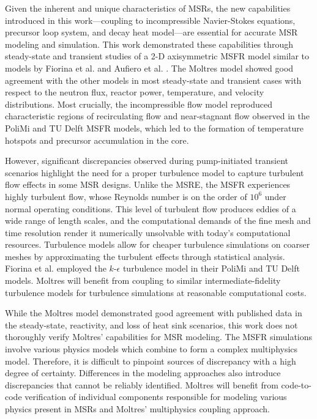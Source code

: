 Given the inherent and unique characteristics of \glspl{MSR}, the new
capabilities introduced in this work---coupling to incompressible Navier-Stokes
equations, precursor loop system, and decay heat model---are essential for
accurate \gls{MSR} modeling and simulation. This work demonstrated these
capabilities through steady-state and transient studies of a 2-D axisymmetric
\gls{MSFR} model similar to models by Fiorina et al.
\cite{fiorina_modelling_2014} and Aufiero et al.
\cite{aufiero_development_2014}. The Moltres model showed good agreement with
the other models in
most steady-state and transient cases with respect to the neutron flux, reactor
power, temperature, and velocity distributions. Most crucially, the
incompressible flow model reproduced characteristic regions of recirculating
flow and near-stagnant flow observed in the PoliMi and TU Delft \gls{MSFR}
models, which led to the formation of temperature hotspots and precursor
accumulation in the core.

However, significant discrepancies observed during pump-initiated transient
scenarios highlight the need for a proper turbulence model to capture
turbulent flow effects in some \gls{MSR} designs. Unlike the \gls{MSRE}, the
\gls{MSFR} experiences highly turbulent flow, whose Reynolds number is on the
order of $10^6$ under normal operating conditions. This level of turbulent flow
produces eddies of a wide range of length scales, and the computational demands
of the fine mesh and time resolution render it numerically unsolvable with
today's computational resources. Turbulence models allow for cheaper turbulence
simulations on coarser meshes by approximating the turbulent effects through
statistical analysis. Fiorina et al. \cite{fiorina_modelling_2014} employed the
$k$-$\epsilon$ turbulence model in their PoliMi and TU Delft models. Moltres
will benefit from coupling to similar intermediate-fidelity turbulence models
for turbulence simulations at reasonable computational costs.

While the Moltres model demonstrated good agreement with published data in the
steady-state, reactivity, and loss of heat sink scenarios, this work does not
thoroughly verify Moltres' capabilities for \gls{MSR} modeling.
The \gls{MSFR} simulations involve various physics models which combine to form
a complex multiphysics model. Therefore, it is difficult to pinpoint sources of
discrepancy with a high degree of certainty. Differences in the modeling
approaches also introduce discrepancies that cannot be reliably identified.
Moltres will benefit from code-to-code verification of
individual components responsible for modeling various physics present in
\glspl{MSR} and Moltres' multiphysics coupling approach.
